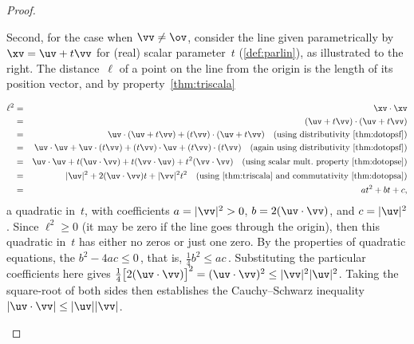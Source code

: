 \begin{proof}
\begin{description}
\begin{figbox}{}
Second, for the case when \(\vv\neq\ov\), consider the line given parametrically by \(\xv=\uv+t\vv\) for (real) scalar parameter~\(t\) (\cref{def:parlin}), as illustrated to the right.
The distance~\(\ell\) of a point on the line from the origin is the length of its position vector, and by property~\ref{thm:triscala}
\end{figbox}
\begin{eqnarray*}
\ell^2&=&\xv\cdot\xv
\\&=&(\uv+t\vv)\cdot(\uv+t\vv)
\\&=&\uv\cdot(\uv+t\vv)+(t\vv)\cdot(\uv+t\vv)
\quad(\text{using distributivity~\ref{thm:dotopsf}})
\\&=&\uv\cdot\uv+\uv\cdot(t\vv)+(t\vv)\cdot\uv+(t\vv)\cdot(t\vv)
\quad(\text{again using distributivity~\ref{thm:dotopsf}})
\\&=&\uv\cdot\uv+t(\uv\cdot\vv)+t(\vv\cdot\uv)+t^2(\vv\cdot\vv)
\quad(\text{using scalar mult.\ property~\ref{thm:dotopse}})
\\&=&|\uv|^2+2(\uv\cdot\vv)t+|\vv|^2t^2
\quad(\text{using~\ref{thm:triscala} and commutativity~\ref{thm:dotopsa}})
\\&=&at^2+bt+c,
\end{eqnarray*}
a quadratic in~\(t\), with coefficients \(a=|\vv|^2>0\), \(b=2(\uv\cdot\vv)\), and \(c=|\uv|^2\).
Since \(\ell^2\geq0\) (it may be zero if the line goes through the origin), then this quadratic in~\(t\) has either no zeros or just one zero.
By the properties of quadratic equations, the  \(b^2-4ac\leq0\)\,, that is, \(\tfrac14b^2\leq ac\)\,.
Substituting the particular coefficients here gives 
\(\tfrac14\big[2(\uv\cdot\vv)\big]^2=(\uv\cdot\vv)^2\leq|\vv|^2|\uv|^2\).
Taking the square-root of both sides then establishes the Cauchy--Schwarz inequality  \(|\uv\cdot\vv|\leq|\uv||\vv|\).


\end{description}
\end{proof}
